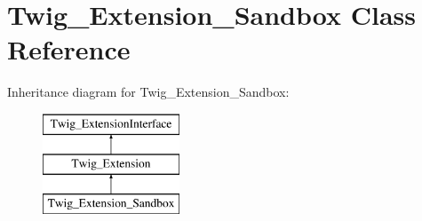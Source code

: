\hypertarget{classTwig__Extension__Sandbox}{}\section{Twig\+\_\+\+Extension\+\_\+\+Sandbox Class Reference}
\label{classTwig__Extension__Sandbox}
Inheritance diagram for Twig\+\_\+\+Extension\+\_\+\+Sandbox\+:\begin{figure}[H]
\begin{center}
\leavevmode
\includegraphics[height=3.000000cm]{classTwig__Extension__Sandbox}
\end{center}
\end{figure}
